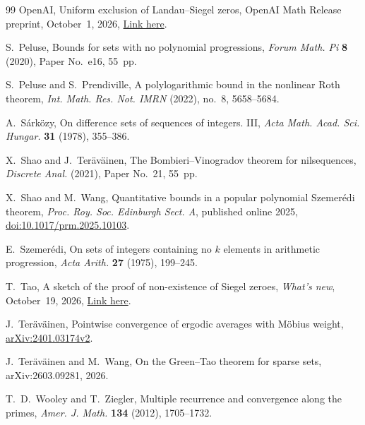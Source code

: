 \documentclass[12pt]{amsart}
\newcommand{\1}{\mathbf 1}
\theoremstyle{definition}
\begin{document}
\begin{thebibliography}{99}
OpenAI, Uniform exclusion of Landau--Siegel zeros, OpenAI Math Release
preprint, October~1, 2026,
\href{https://github.com/openai/math/blob/main/preprints/Uniform-exclusion-of-Landau-Siegel-zeros-October-1-2026/README.md}{Link here}.

S.~Peluse, Bounds for sets with no polynomial progressions,
\textit{Forum Math. Pi} \textbf{8} (2020), Paper No.~e16, 55~pp.

S.~Peluse and S.~Prendiville, A polylogarithmic bound in the nonlinear
Roth theorem, \textit{Int. Math. Res. Not. IMRN} (2022), no.~8,
5658--5684.

A.~S\'ark\"ozy, On difference sets of sequences of integers. III,
\textit{Acta Math. Acad. Sci. Hungar.} \textbf{31} (1978), 355--386.

X.~Shao and J.~Ter\"av\"ainen, The Bombieri--Vinogradov theorem for
nilsequences, \textit{Discrete Anal.} (2021), Paper No.~21, 55~pp.

X.~Shao and M.~Wang, Quantitative bounds in a popular polynomial Szemer\'edi
theorem, \textit{Proc. Roy. Soc. Edinburgh Sect. A}, published online 2025,
\href{https://doi.org/10.1017/prm.2025.10103}{doi:10.1017/prm.2025.10103}.

E.~Szemer\'edi, On sets of integers containing no $k$ elements in arithmetic
progression, \textit{Acta Arith.} \textbf{27} (1975), 199--245.

T.~Tao, A sketch of the proof of non-existence of Siegel zeroes,
\textit{What's new}, October~19, 2026,
\href{https://terrytao.wordpress.com/2026/10/19/a-sketch-of-the-proof-of-non-existence-of-siegel-zeroes/}{Link here}.

J.~Ter\"av\"ainen, Pointwise convergence of ergodic averages with M\"obius
weight, \href{https://arxiv.org/abs/2401.03174v2}{arXiv:2401.03174v2}.

J.~Ter\"av\"ainen and M.~Wang,
On the Green--Tao theorem for sparse sets,
arXiv:2603.09281, 2026.

T.~D.~Wooley and T.~Ziegler, Multiple recurrence and convergence along the
primes, \textit{Amer. J. Math.} \textbf{134} (2012), 1705--1732.
\end{thebibliography}
\end{document}

